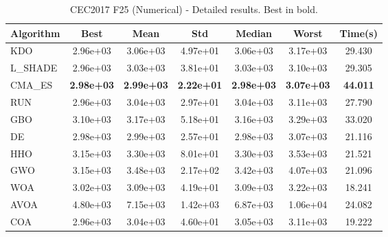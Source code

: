 \begin{table}[H]
\centering\small
\caption{CEC2017 F25 (Numerical) - Detailed results. Best in bold.}
\label{tab:cec2017_F25}
\begin{tabular}{lcccccc}
\toprule
\textbf{Algorithm} & \textbf{Best} & \textbf{Mean} & \textbf{Std} & \textbf{Median} & \textbf{Worst} & \textbf{Time(s)} \\
\midrule
KDO & 2.96e+03 & 3.06e+03 & 4.97e+01 & 3.06e+03 & 3.17e+03 & 29.430 \\
L_SHADE & 2.96e+03 & 3.03e+03 & 3.81e+01 & 3.03e+03 & 3.10e+03 & 29.305 \\
CMA_ES & \textbf{2.98e+03} & \textbf{2.99e+03} & \textbf{2.22e+01} & \textbf{2.98e+03} & \textbf{3.07e+03} & \textbf{44.011} \\
RUN & 2.96e+03 & 3.04e+03 & 2.97e+01 & 3.04e+03 & 3.11e+03 & 27.790 \\
GBO & 3.10e+03 & 3.17e+03 & 5.18e+01 & 3.16e+03 & 3.29e+03 & 33.020 \\
DE & 2.98e+03 & 2.99e+03 & 2.57e+01 & 2.98e+03 & 3.07e+03 & 21.116 \\
HHO & 3.15e+03 & 3.30e+03 & 8.01e+01 & 3.30e+03 & 3.53e+03 & 21.521 \\
GWO & 3.15e+03 & 3.48e+03 & 2.17e+02 & 3.42e+03 & 4.07e+03 & 21.096 \\
WOA & 3.02e+03 & 3.09e+03 & 4.19e+01 & 3.09e+03 & 3.22e+03 & 18.241 \\
AVOA & 4.80e+03 & 7.15e+03 & 1.42e+03 & 6.87e+03 & 1.06e+04 & 24.082 \\
COA & 2.96e+03 & 3.04e+03 & 4.60e+01 & 3.05e+03 & 3.11e+03 & 19.222 \\
\bottomrule
\end{tabular}
\end{table}
